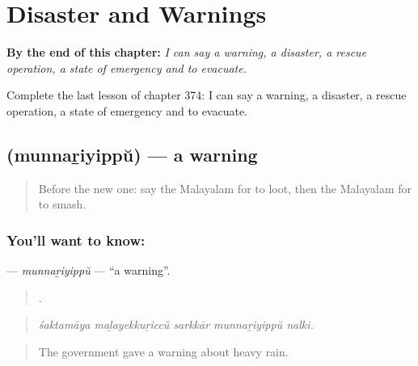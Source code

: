 
\chapter{Disaster and Warnings}
\label{ch:ml-disaster-and-warnings}

\begin{chapteropening}
\textbf{By the end of this chapter:} \emph{I can say a warning, a disaster, a rescue operation, a state of emergency and to evacuate.}

Complete the last lesson of chapter 374: I can say a warning, a disaster, a rescue operation, a state of emergency and to evacuate.
\end{chapteropening}

\section[\texorpdfstring{\ml{മുന്നറിയിപ്പ്} (munnaṟiyippŭ)}{മുന്നറിയിപ്പ് (munnaṟiyippŭ)}]{ (munnaṟiyippŭ) — a warning}

\label{lesson:ML-C374-munnariyippu}



\begin{quote}
Before the new one: say the Malayalam for to loot, then the Malayalam for to smash.
\end{quote}

\subsection*{You'll want to know: }
\textbf{} — \emph{munnaṟiyippŭ} — \textquotedblleft{}a warning\textquotedblright{}.

\begin{quote}
    .
\end{quote}

\begin{quote}
\emph{śaktamāya maḻayekkuṟiccŭ sarkkār munnaṟiyippŭ nalki.}
\end{quote}

\begin{quote}
The government gave a warning about heavy rain.
\end{quote}

